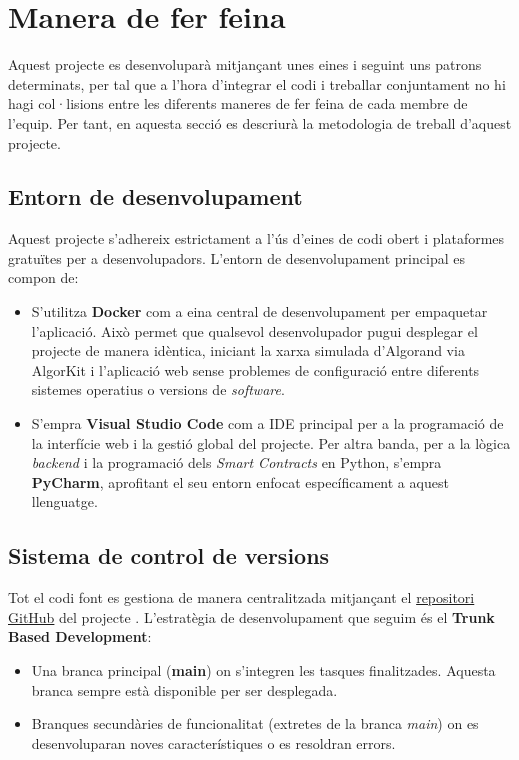 \section{Manera de fer feina}
Aquest projecte es desenvoluparà mitjançant unes eines i seguint uns patrons determinats, per tal que a l'hora d'integrar el codi i treballar conjuntament no hi hagi col·lisions entre les diferents maneres de fer feina de cada membre de l'equip. Per tant, en aquesta secció es descriurà la metodologia de treball d'aquest projecte.

\subsection{Entorn de desenvolupament}
Aquest projecte s'adhereix estrictament a l'ús d'eines de codi obert i plataformes gratuïtes per a desenvolupadors. L'entorn de desenvolupament principal es compon de:

\begin{itemize}
    \item S'utilitza \textbf{Docker} com a eina central de desenvolupament per empaquetar l'aplicació. Això permet que qualsevol desenvolupador pugui desplegar el projecte de manera idèntica, iniciant la xarxa simulada d'Algorand via AlgorKit i l'aplicació web sense problemes de configuració entre diferents sistemes operatius o versions de \textit{software}.
    \item S'empra \textbf{Visual Studio Code} com a IDE principal per a la programació de la interfície web i la gestió global del projecte. Per altra banda, per a la lògica \textit{backend} i la programació dels \textit{Smart Contracts} en Python, s'empra \textbf{PyCharm}, aprofitant el seu entorn enfocat específicament a aquest llenguatge.
\end{itemize}

\subsection{Sistema de control de versions}
Tot el codi font es gestiona de manera centralitzada mitjançant el \href{https://github.com/linkcla/sistema-votacio-blockchain}{repositori GitHub} del projecte . L'estratègia de desenvolupament que seguim és el \textbf{Trunk Based Development}:

\begin{itemize}
    \item Una branca principal (\textbf{main}) on s'integren les tasques finalitzades. Aquesta branca sempre està disponible per ser desplegada.
    \item Branques secundàries de funcionalitat (extretes de la branca \textit{main}) on es desenvoluparan noves característiques o es resoldran errors.
\end{itemize}

